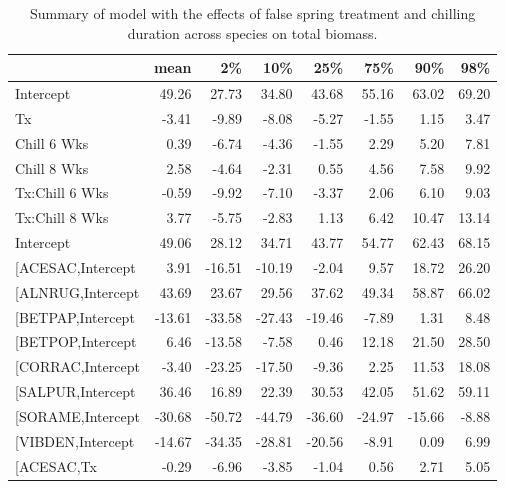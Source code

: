 \documentclass{article}\usepackage[]{graphicx}\usepackage[]{color}
\makeatletter
\newenvironment{kframe}{%
 \def\at@end@of@kframe{}%
 \ifinner\ifhmode%
  \def\at@end@of@kframe{\end{minipage}}%
  \begin{minipage}{\columnwidth}%
 \fi\fi%
 \def\FrameCommand##1{\hskip\@totalleftmargin \hskip-\fboxsep
 \colorbox{shadecolor}{##1}\hskip-\fboxsep
     \hskip-\linewidth \hskip-\@totalleftmargin \hskip\columnwidth}%
 \MakeFramed {\advance\hsize-\width
   \@totalleftmargin\z@ \linewidth\hsize
   \@setminipage}}%
 {\par\unskip\endMakeFramed%
 \at@end@of@kframe}
\makeatother
\begin{document}
\newpage
\begin{kframe}


{\ttfamily\noindent\bfseries\color{errorcolor}{\#\# Error in gsub("{}["{}, "{}"{}, modoutput\$term): invalid regular expression '[', reason 'Missing ']''}}\end{kframe}%
\begin{longtable}{lrrrrrrr}
\caption{Summary of model with the effects of false spring treatment and chilling duration across species on total biomass.} \\ 
  \hline
 & mean & 2\% & 10\% & 25\% & 75\% & 90\% & 98\% \\ 
  \hline \endhead  \hline
Intercept & 49.26 & 27.73 & 34.80 & 43.68 & 55.16 & 63.02 & 69.20 \\ 
  Tx & -3.41 & -9.89 & -8.08 & -5.27 & -1.55 & 1.15 & 3.47 \\ 
  Chill 6 Wks & 0.39 & -6.74 & -4.36 & -1.55 & 2.29 & 5.20 & 7.81 \\ 
  Chill 8 Wks & 2.58 & -4.64 & -2.31 & 0.55 & 4.56 & 7.58 & 9.92 \\ 
  Tx:Chill 6 Wks & -0.59 & -9.92 & -7.10 & -3.37 & 2.06 & 6.10 & 9.03 \\ 
  Tx:Chill 8 Wks & 3.77 & -5.75 & -2.83 & 1.13 & 6.42 & 10.47 & 13.14 \\ 
  Intercept & 49.06 & 28.12 & 34.71 & 43.77 & 54.77 & 62.43 & 68.15 \\ 
  [ACESAC,Intercept & 3.91 & -16.51 & -10.19 & -2.04 & 9.57 & 18.72 & 26.20 \\ 
  [ALNRUG,Intercept & 43.69 & 23.67 & 29.56 & 37.62 & 49.34 & 58.87 & 66.02 \\ 
  [BETPAP,Intercept & -13.61 & -33.58 & -27.43 & -19.46 & -7.89 & 1.31 & 8.48 \\ 
  [BETPOP,Intercept & 6.46 & -13.58 & -7.58 & 0.46 & 12.18 & 21.50 & 28.50 \\ 
  [CORRAC,Intercept & -3.40 & -23.25 & -17.50 & -9.36 & 2.25 & 11.53 & 18.08 \\ 
  [SALPUR,Intercept & 36.46 & 16.89 & 22.39 & 30.53 & 42.05 & 51.62 & 59.11 \\ 
  [SORAME,Intercept & -30.68 & -50.72 & -44.79 & -36.60 & -24.97 & -15.66 & -8.88 \\ 
  [VIBDEN,Intercept & -14.67 & -34.35 & -28.81 & -20.56 & -8.91 & 0.09 & 6.99 \\ 
  [ACESAC,Tx & -0.29 & -6.96 & -3.85 & -1.04 & 0.56 & 2.71 & 5.05 \\ 

\end{longtable}
\end{document}

